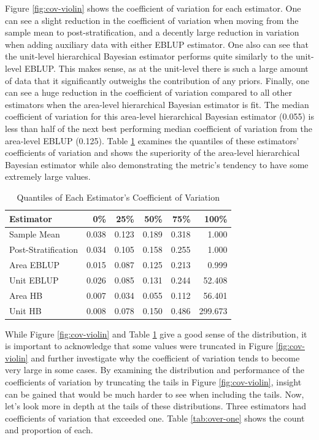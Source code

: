 \documentclass[12pt,twoside]{reedthesis}
\begin{document}
Figure \ref{fig:cov-violin} shows the coefficient of variation for each estimator. One can see a slight reduction in the coefficient of variation when moving from the sample mean to post-stratification, and a decently large reduction in variation when adding auxiliary data with either EBLUP estimator. One also can see that the unit-level hierarchical Bayesian estimator performs quite similarly to the unit-level EBLUP. This makes sense, as at the unit-level there is such a large amount of data that it significantly outweighs the contribution of any priors. Finally, one can see a huge reduction in the coefficient of variation compared to all other estimators when the area-level hierarchical Bayesian estimator is fit. The median coefficient of variation for this area-level hierarchical Bayesian estimator (0.055) is less than half of the next best performing median coefficient of variation from the area-level EBLUP (0.125). Table \ref{tab:quantile-table} examines the quantiles of these estimators' coefficients of variation and shows the superiority of the area-level hierarchical Bayesian estimator while also demonstrating the metric's tendency to have some extremely large values.
\begin{longtable}[t]{lrrrrr}
\caption[Coefficient of Variation Quantiles]{\label{tab:quantile-table}Quantiles of Each Estimator's Coefficient of Variation}\\
\toprule
Estimator & 0\% & 25\% & 50\% & 75\% & 100\%\\
\midrule
Sample Mean & 0.038 & 0.123 & 0.189 & 0.318 & 1.000\\
Post-Stratification & 0.034 & 0.105 & 0.158 & 0.255 & 1.000\\
Area EBLUP & 0.015 & 0.087 & 0.125 & 0.213 & 0.999\\
Unit EBLUP & 0.026 & 0.085 & 0.131 & 0.244 & 52.408\\
Area HB & 0.007 & 0.034 & 0.055 & 0.112 & 56.401\\
\addlinespace
Unit HB & 0.008 & 0.078 & 0.150 & 0.486 & 299.673\\
\bottomrule
\end{longtable}
While Figure \ref{fig:cov-violin} and Table \ref{tab:quantile-table} give a good sense of the distribution, it is important to acknowledge that some values were truncated in Figure \ref{fig:cov-violin} and further investigate why the coefficient of variation tends to become very large in some cases. By examining the distribution and performance of the coefficients of variation by truncating the tails in Figure \ref{fig:cov-violin}, insight can be gained that would be much harder to see when including the tails. Now, let's look more in depth at the tails of these distributions. Three estimators had coefficients of variation that exceeded one. Table \ref{tab:over-one} shows the count and proportion of each.
\end{document}
